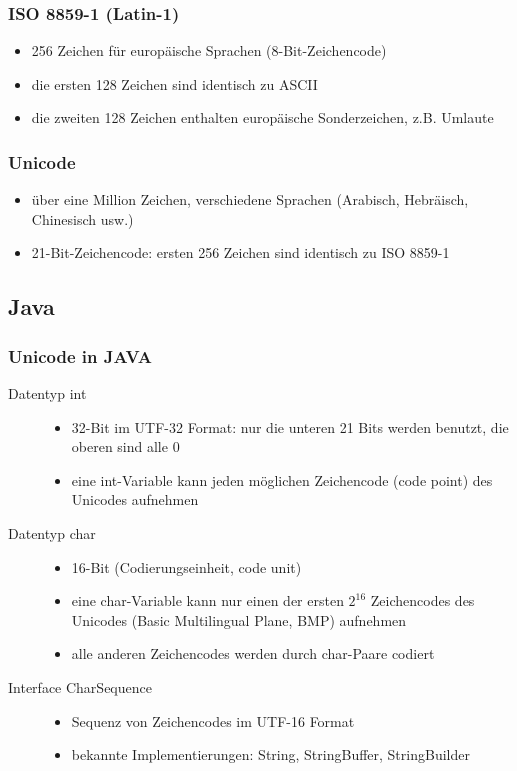 \documentclass[a4paper,10pt]{article}
\begin{document}
\subsubsection{ISO 8859-1 (Latin-1)}
\begin{itemize}
	\item 256 Zeichen f\"ur europ\"aische Sprachen (8-Bit-Zeichencode)
	\item die ersten 128 Zeichen sind identisch zu ASCII
	\item die zweiten 128 Zeichen enthalten europ\"aische Sonderzeichen, z.B. Umlaute
\end{itemize}
\subsubsection{Unicode}
\begin{itemize}
	\item \"uber eine Million Zeichen, verschiedene Sprachen (Arabisch, Hebr\"aisch, Chinesisch usw.)
	\item 21-Bit-Zeichencode: ersten 256 Zeichen sind identisch zu ISO 8859-1
\end{itemize}

\subsection{Java}
\subsubsection{Unicode in JAVA}
\begin{description}
	\item[Datentyp int] \hfill 
		\begin{itemize}
			\item 32-Bit im UTF-32 Format: nur die unteren 21 Bits werden benutzt, die oberen sind alle 0
			\item eine int-Variable kann jeden m\"oglichen Zeichencode (code point) des Unicodes aufnehmen
		\end{itemize}
	\item[Datentyp char] \hfill 
		\begin{itemize}
			\item 16-Bit (Codierungseinheit, code unit)
			\item eine char-Variable kann nur einen der ersten $2^{16}$ Zeichencodes des Unicodes (Basic Multilingual Plane, BMP) aufnehmen
			\item alle anderen Zeichencodes werden durch char-Paare codiert
		\end{itemize}
	\item[Interface CharSequence] \hfill 
		\begin{itemize}
			\item Sequenz von Zeichencodes im UTF-16 Format
			\item bekannte Implementierungen: String, StringBuffer, StringBuilder
		\end{itemize}
\end{description}
\end{document}
